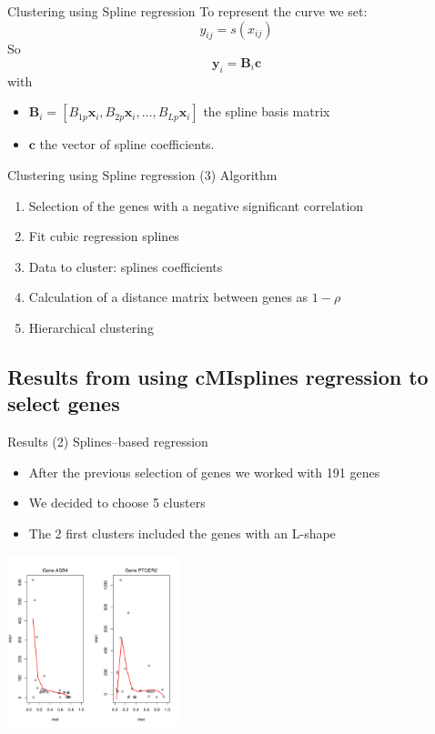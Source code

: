 \documentclass[handout]{beamer}
\begin{document}
\begin{frame}{Clustering using Spline regression}
To represent the curve we set:
\[
y_{ij}=s(x_{ij})
\]
So
\[ 
\mathbf{y}_i=\mathbf{B}_i\mathbf{c}
\]
with
\begin {itemize}
\item $\mathbf{B}_i=\left[ B_{1p}\mathbf{x}_i,B_{2p}\mathbf{x}_i,\dots,B_{Lp}\mathbf{x}_i \right]$ the spline basis matrix
\item $\mathbf{c}$ the vector of spline coefficients.
\end{itemize}
\end{frame}

\begin{frame}{Clustering using Spline regression (3)}
Algorithm
\begin {enumerate}
\item Selection of the genes with a negative significant correlation
\item Fit cubic regression splines
\item Data to cluster: splines coefficients
\item Calculation of a distance matrix between genes as $1-\rho$
\item Hierarchical clustering 
\end{enumerate}
\end{frame}

\subsection{Results from using cMIsplines regression to select genes}

\begin {frame}{Results (2) Splines--based regression}
\begin {itemize}
\item After the previous selection of genes we worked with 191 genes
\item We decided to choose 5 clusters
\item The 2 first clusters included the genes with an L-shape
\end{itemize}
\begin{center}
\includegraphics[height=5cm]{./images/grafic_two_patterns.pdf}
\end{center}
\end{frame}
\end{document}

